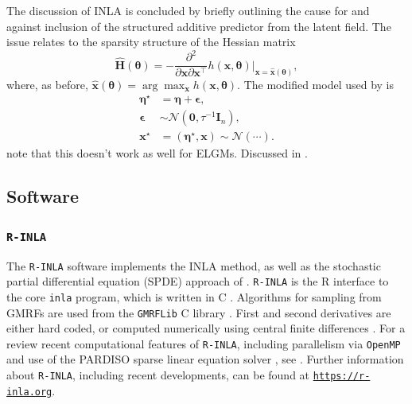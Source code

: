 \documentclass[a4paper, nobind]{templates/ociamthesis}
\begin{document}
The discussion of INLA is concluded by briefly outlining the cause for and against inclusion of the structured additive predictor from the latent field.
The issue relates to the sparsity structure of the Hessian matrix
\begin{equation}
\hat {\mathbf{H}}(\boldsymbol{\mathbf{\theta}}) = - \frac{\partial^2}{\partial \mathbf{x} \partial \mathbf{x}^\top} h(\mathbf{x}, \boldsymbol{\mathbf{\theta}}) \rvert_{\mathbf{x} = \hat{\mathbf{x}}(\boldsymbol{\mathbf{\theta}})},
\end{equation}
where, as before, \(\hat{\mathbf{x}}(\boldsymbol{\mathbf{\theta}}) = \arg\max_{\mathbf{x}} h(\mathbf{x}, \boldsymbol{\mathbf{\theta}})\).
The modified model used by \textcite{rue2009approximate} is
\begin{align}
\boldsymbol{\mathbf{\eta}}^\star &= \boldsymbol{\mathbf{\eta}} + \boldsymbol{\mathbf{\epsilon}}, \\
\boldsymbol{\mathbf{\epsilon}} &\sim \mathcal{N}(\mathbf{0}, \tau^{-1} \mathbf{I}_n), \\
\mathbf{x}^\star &= (\boldsymbol{\mathbf{\eta}}^\star, \mathbf{x}) \sim \mathcal{N}(\cdots).
\end{align}
\textcite{stringer2022fast} note that this doesn't work as well for ELGMs.
Discussed in \textcite{van2023new}.

\hypertarget{software}{%
\subsection{Software}\label{software}}

\hypertarget{r-inla}{%
\subsubsection{\texorpdfstring{\texttt{R-INLA}}{R-INLA}}\label{r-inla}}

The \texttt{R-INLA} software \autocite{martins2013bayesian} implements the INLA method, as well as the stochastic partial differential equation (SPDE) approach of \textcite{lindgren2011explicit}.
\texttt{R-INLA} is the R interface to the core \texttt{inla} program, which is written in C \autocite{martino2009implementing}.
Algorithms for sampling from GMRFs are used from the \texttt{GMRFLib} C library \autocite{rue2001gmrflib}.
First and second derivatives are either hard coded, or computed numerically using central finite differences \autocite{fattah2021smart}.
For a review recent computational features of \texttt{R-INLA}, including parallelism via \texttt{OpenMP} \autocite{diaz2018openmp} and use of the PARDISO sparse linear equation solver \autocite{bollhofer2020state}, see \textcite{gaedke2023parallelized}.
Further information about \texttt{R-INLA}, including recent developments, can be found at \href{https://r-inla.org}{\texttt{https://r-inla.org}}.
\end{document}
